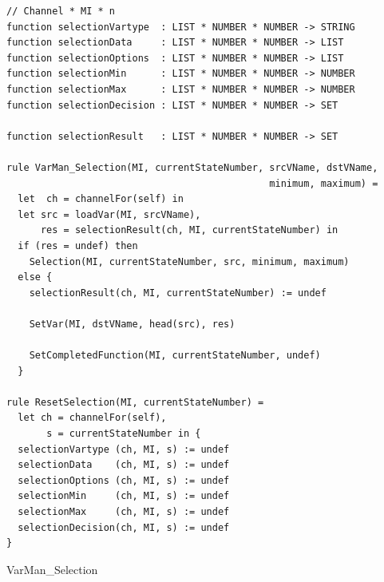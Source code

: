\begin{listing}[H]
\begin{verbatim}
// Channel * MI * n
function selectionVartype  : LIST * NUMBER * NUMBER -> STRING
function selectionData     : LIST * NUMBER * NUMBER -> LIST
function selectionOptions  : LIST * NUMBER * NUMBER -> LIST
function selectionMin      : LIST * NUMBER * NUMBER -> NUMBER
function selectionMax      : LIST * NUMBER * NUMBER -> NUMBER
function selectionDecision : LIST * NUMBER * NUMBER -> SET

function selectionResult   : LIST * NUMBER * NUMBER -> SET

rule VarMan_Selection(MI, currentStateNumber, srcVName, dstVName,
                                              minimum, maximum) =
  let  ch = channelFor(self) in
  let src = loadVar(MI, srcVName),
      res = selectionResult(ch, MI, currentStateNumber) in
  if (res = undef) then
    Selection(MI, currentStateNumber, src, minimum, maximum)
  else {
    selectionResult(ch, MI, currentStateNumber) := undef

    SetVar(MI, dstVName, head(src), res)

    SetCompletedFunction(MI, currentStateNumber, undef)
  }

rule ResetSelection(MI, currentStateNumber) =
  let ch = channelFor(self),
       s = currentStateNumber in {
  selectionVartype (ch, MI, s) := undef
  selectionData    (ch, MI, s) := undef
  selectionOptions (ch, MI, s) := undef
  selectionMin     (ch, MI, s) := undef
  selectionMax     (ch, MI, s) := undef
  selectionDecision(ch, MI, s) := undef
}
\end{verbatim}
\caption{VarMan\_Selection}
\label{lst:asm:VarMan_Selection}
\end{listing}




